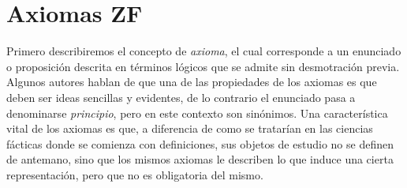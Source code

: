 \documentclass[11pt,a4paper]{book}
\begin{document}
\section{Axiomas ZF}
Primero describiremos el concepto de \textit{axioma}, el cual corresponde a un enunciado o proposición descrita en términos lógicos que se admite sin desmotración previa. Algunos autores hablan de que una de las propiedades de los axiomas es que deben ser ideas sencillas y evidentes, de lo contrario el enunciado pasa a denominarse \textit{principio}, pero en este contexto son sinónimos. Una característica vital de los axiomas es que, a diferencia de como se tratarían en las ciencias fácticas donde se comienza con definiciones, sus objetos de estudio no se definen de antemano, sino que los mismos axiomas le describen lo que induce una cierta representación, pero que no es obligatoria del mismo.
\end{document}

